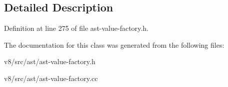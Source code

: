 \subsection{Detailed Description}


Definition at line 275 of file ast-\/value-\/factory.\+h.



The documentation for this class was generated from the following files\+:\begin{DoxyCompactItemize}
\item 
v8/src/ast/ast-\/value-\/factory.\+h\item 
v8/src/ast/ast-\/value-\/factory.\+cc\end{DoxyCompactItemize}
